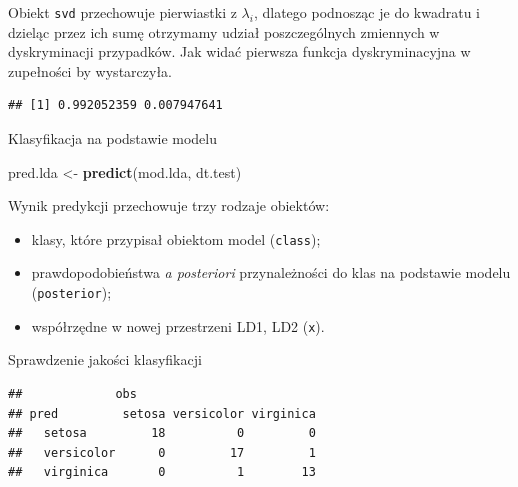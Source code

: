 \documentclass[
]{book}
\newenvironment{Shaded}{\begin{snugshade}}{\end{snugshade}}
\newcommand{\DataTypeTok}[1]{\textcolor[rgb]{0.13,0.29,0.53}{#1}}
\newcommand{\DecValTok}[1]{\textcolor[rgb]{0.00,0.00,0.81}{#1}}
\newcommand{\KeywordTok}[1]{\textcolor[rgb]{0.13,0.29,0.53}{\textbf{#1}}}
\newcommand{\NormalTok}[1]{#1}
\newcommand{\OperatorTok}[1]{\textcolor[rgb]{0.81,0.36,0.00}{\textbf{#1}}}
\newcommand{\StringTok}[1]{\textcolor[rgb]{0.31,0.60,0.02}{#1}}
\providecommand{\tightlist}{%
  \setlength{\itemsep}{0pt}\setlength{\parskip}{0pt}}
\theoremstyle{plain}
\theoremstyle{definition}
\theoremstyle{definition}
\theoremstyle{definition}
\theoremstyle{definition}
\theoremstyle{remark}
\begin{document}
Obiekt \texttt{svd} przechowuje pierwiastki z \(\lambda_i\), dlatego podnosząc je do kwadratu i dzieląc przez ich sumę otrzymamy udział poszczególnych zmiennych w dyskryminacji przypadków. Jak widać pierwsza funkcja dyskryminacyjna w zupełności by wystarczyła.

\begin{Shaded}
\end{Shaded}

\begin{verbatim}
## [1] 0.992052359 0.007947641
\end{verbatim}

Klasyfikacja na podstawie modelu

\begin{Shaded}
\begin{Highlighting}[]
\NormalTok{pred.lda <-}\StringTok{ }\KeywordTok{predict}\NormalTok{(mod.lda, dt.test)}
\end{Highlighting}
\end{Shaded}

Wynik predykcji przechowuje trzy rodzaje obiektów:

\begin{itemize}
\tightlist
\item
  klasy, które przypisał obiektom model (\texttt{class});
\item
  prawdopodobieństwa \emph{a posteriori} przynależności do klas na podstawie modelu (\texttt{posterior});
\item
  współrzędne w nowej przestrzeni LD1, LD2 (\texttt{x}).
\end{itemize}

Sprawdzenie jakości klasyfikacji

\begin{Shaded}
\end{Shaded}

\begin{verbatim}
##             obs
## pred         setosa versicolor virginica
##   setosa         18          0         0
##   versicolor      0         17         1
##   virginica       0          1        13
\end{verbatim}
\end{document}
